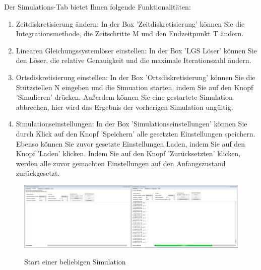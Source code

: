 \newpage
\noindent
Der Simulations-Tab bietet Ihnen folgende Funktionalitäten:\\
\begin{enumerate}
\item Zeitdiskretisierung ändern:
In der Box 'Zeitdiskretisierung' können Sie die Integrationsmethode, die Zeitschritte M und den Endzeitpunkt T ändern.
\item Linearen Gleichungssystemlöser einstellen:
In der Box 'LGS Löser' können Sie den Löser, die relative Genauigkeit und die maximale Iterationszahl ändern.
\item Ortsdiskretisierung einstellen:
In der Box 'Ortsdiskretisierung' können Sie die Stützstellen N eingeben und die Simuation starten, indem Sie auf den Knopf 'Simulieren' drücken. Außerdem können Sie eine gestartete Simulation abbrechen, hier wird das Ergebnis der vorherigen Simulation ungültig.
\item Simulationseinstellungen:
In der Box 'Simulationseinstellungen' können Sie durch Klick auf den Knopf 'Speichern' alle gesetzten Einstellungen speichern. Ebenso können Sie zuvor gesetzte Einstellungen Laden, indem Sie auf den Knopf 'Laden' klicken. Indem Sie auf den Knopf 'Zurücksetzten' klicken, werden alle zuvor gemachten Einstellungen auf den Anfangszustand zurückgesetzt.
\end{enumerate}
\begin{figure}[H]
\centering
\includegraphics[scale=.25]{Benutzerdokumentation/SimulationStarten.png}\\
\caption{Start einer beliebigen Simulation}
\label{SimulationStarten}
\end{figure}


